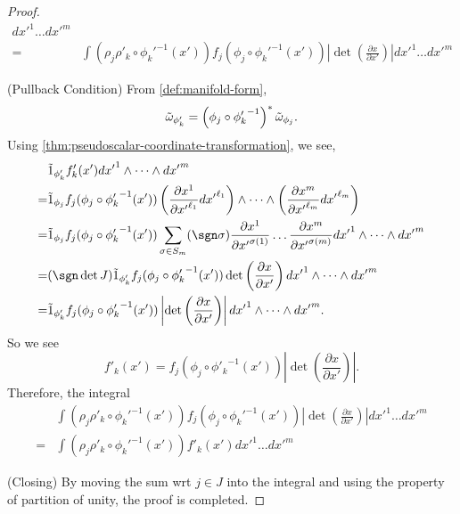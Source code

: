\documentclass[../main.tex]{subfiles}
\begin{document}
\begin{proof}
\[\begin{aligned}
            {dx'}^1\dots {dx'}^m \\
            =&\int (\rho_j\rho'_k\circ{\phi_k'}^{-1}(x'))
            f_j(\phi_j\circ{\phi_k'}^{-1}(x')) 
            \left|\det \left(\frac{\partial x}{\partial x'}\right)\right|
            {dx'}^1\dots {dx'}^m
        \end{aligned}
        \]\par
        (Pullback Condition) From \cref{def:manifold-form},
        \[
        \tilde{\omega}_{\phi_k'}=\left(\phi_j\circ {\phi_k'}^{-1}\right)^*
        \tilde{\omega}_{\phi_j}.
        \]
        Using \cref{thm:pseudoscalar-coordinate-transformation}, we see,
        \[
        \begin{aligned}
            &\pseudo{1}_{\phi_k'}f'_k(x'){dx'}^1\wedge\dots\wedge{dx'}^m \\
            =&\pseudo{1}_{\phi_j}f_j(\phi_j\circ {\phi_k'}^{-1}(x'))
            \left(\frac{\partial x^1}{\partial {x'}^{\ell_1}}{dx'}^{\ell_1}\right)
            \wedge \dots\wedge 
            \left(\frac{\partial x^m}{\partial {x'}^{\ell_m}}{dx'}^{\ell_m}\right) \\
            =&\pseudo{1}_{\phi_j}f_j(\phi_j\circ {\phi_k'}^{-1}(x'))
            \sum_{\sigma \in S_m}^{}
            (\sgn \sigma)\frac{\partial x^1}{\partial {x'}^{\sigma(1)}}\dots
            \frac{\partial x^m}{\partial {x'}^{\sigma(m)}}
            {dx'}^1\wedge\dots\wedge{dx'}^m \\
            =&(\sgn\det J)\pseudo{1}_{\phi_k'}f_j(\phi_j\circ {\phi'_k}^{-1}(x'))
            \det \left(\frac{\partial x}{\partial x'}\right)
            {dx'}^1\wedge\dots\wedge{dx'}^m \\
            =&\pseudo{1}_{\phi_k'}f_j(\phi_j\circ {\phi'_k}^{-1}(x'))
            \left|\det \left(\frac{\partial x}{\partial x'}\right)\right|
            {dx'}^1\wedge\dots\wedge{dx'}^m.
        \end{aligned}
        \]
        So we see 
        \[
        f'_k(x')=f_j(\phi_j\circ {\phi'_k}^{-1}(x'))
        \left|\det \left(\frac{\partial x}{\partial x'}\right)\right|.
        \]
        Therefore, the integral 
        \[
        \begin{aligned}
            &\int (\rho_j\rho'_k\circ{\phi_k'}^{-1}(x'))
            f_j(\phi_j\circ{\phi_k'}^{-1}(x')) 
            \left|\det \left(\frac{\partial x}{\partial x'}\right)\right|
            {dx'}^1\dots {dx'}^m \\
            =&\int (\rho_j\rho'_k\circ{\phi_k'}^{-1}(x'))
            f'_k(x')
            {dx'}^1\dots {dx'}^m
        \end{aligned}
        \]\par
        (Closing) By moving the sum wrt \(j \in J\) into the integral and using 
        the property of partition of unity, the proof is completed.
    \end{proof}
\end{document}
